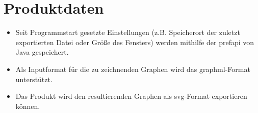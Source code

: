 \chapter{Produktdaten}

\begin{itemize}
\item Seit Programmstart gesetzte Einstellungen (z.B. Speicherort der zuletzt exportierten Datei oder Größe des Fensters) werden mithilfe der \gls{prefapi} von Java gespeichert.
\item Als Inputformat für die zu zeichnenden Graphen wird das \gls{graphml}-Format unterstützt.
\item Das Produkt wird den resultierenden Graphen als \gls{svg}-Format exportieren können.
\end{itemize}